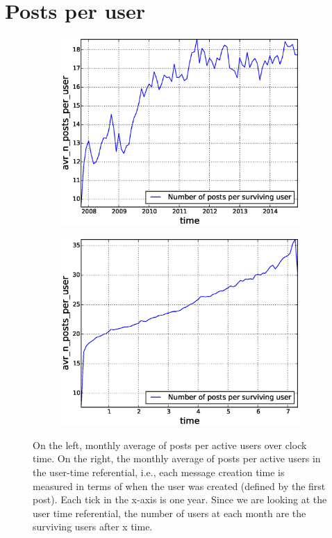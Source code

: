 \section{Posts per user}

\begin{figure}[!tb]
\centering
\begin{subfigure}{.49\textwidth}\includegraphics[scale=0.4]{./images/avr_posts_per_user_over_time_total.eps}\caption{}\end{subfigure}
\begin{subfigure}{.49\textwidth}\includegraphics[scale=0.4]{./images/avr_posts_per_user_user_ref_total.eps}\caption{}\end{subfigure}
\caption{On the left, monthly average of posts per active users over clock time. On the right, the monthly average of posts per active users in the user-time referential, i.e., each message creation time is measured in terms of when the user was created (defined by the first post). Each tick in the x-axis is one year. Since we are looking at the user time referential, the number of users at each month are the surviving users after x time.}
\label{fig:overall_posts}
\end{figure}

